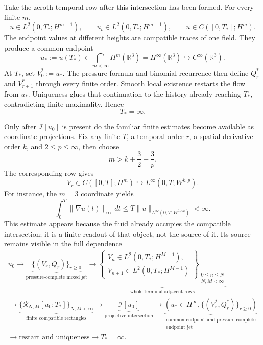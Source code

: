 Take the zeroth temporal row after this intersection has been formed.  For
every finite \(m\),
\[
 u\in L^2(0,T_*;H^{m+1}),
 \qquad
 u_t\in L^2(0,T_*;H^{m-1}),
 \qquad
 u\in C([0,T_*];H^m).
\]
The endpoint values at different heights are compatible traces of one field.
They produce a common endpoint
\[
 u_*:=u(T_*)\in\bigcap_{m<\infty}H^m(\mathbb R^3)
 =H^\infty(\mathbb R^3)
 \hookrightarrow C^\infty(\mathbb R^3).
\]
At \(T_*\), set \(V_0^*:=u_*\).  The pressure formula and binomial recurrence
then define \(Q_r^*\) and \(V_{r+1}^*\) through every finite order.  Smooth
local existence restarts the flow from \(u_*\).  Uniqueness glues that
continuation to the history already reaching \(T_*\), contradicting finite
maximality.
Hence
\[
 T_*=\infty.
\]

Only after \(\mathcal I[u_0]\) is present do the familiar finite estimates
become available as coordinate projections.  Fix any finite \(T\), a temporal
order \(r\), a spatial derivative order \(k\), and \(2\le p\le\infty\), then
choose
\[
 m>k+\frac32-\frac3p.
\]
The corresponding row gives
\[
 V_r\in C([0,T];H^m)
 \hookrightarrow L^\infty(0,T;W^{k,p}).
\]
For instance, the \(m=3\) coordinate yields
\[
 \int_0^{T}\|\nabla u(t)\|_\infty\,dt
 \le T\|u\|_{L^\infty(0,T;W^{1,\infty})}<\infty.
\]
This estimate appears because the fluid already occupies the compatible
intersection; it is a finite readout of that object, not the source of it.
Its source remains visible in the full dependence
\[
\begin{gathered}
 u_0
 \longrightarrow
 \underbrace{\{(V_r,Q_r)\}_{r\ge0}}_{\text{pressure-complete mixed jet}}
 \longrightarrow
 \underbrace{\left\{
  \begin{gathered}
   V_n\in L^2(0,T_*;H^{M+1}),\\[-1pt]
   V_{n+1}\in L^2(0,T_*;H^{M-1})
  \end{gathered}
 \right\}_{\substack{0\le n\le N\\N,M<\infty}}}_{
 \text{whole-terminal adjacent rows}}
 \\
 \longrightarrow
 \underbrace{\{\mathcal R_{N,M}[u_0;T_*]\}_{N,M<\infty}}_{
 \text{finite compatible rectangles}}
 \longrightarrow
 \underbrace{\mathcal I[u_0]}_{\text{projective intersection}}
 \longrightarrow
 \underbrace{\left(
  u_*\in H^\infty,
  \{(V_r^*,Q_r^*)\}_{r\ge0}
 \right)}_{\substack{\text{common endpoint and pressure-complete}\\
                     \text{endpoint jet}}}
 \\
 \longrightarrow \text{restart and uniqueness}
 \longrightarrow T_*=\infty.
\end{gathered}
\]

\endgroup
